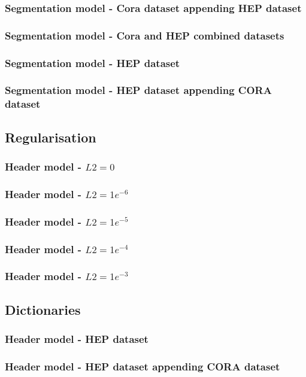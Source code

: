 \documentclass[10pt, oneside]{scrartcl}   	%
\begin{document}
\subsubsection{Segmentation model - Cora dataset appending HEP dataset}
\subsubsection{Segmentation model - Cora and HEP combined datasets}
\subsubsection{Segmentation model - HEP dataset}
\subsubsection{Segmentation model - HEP dataset appending CORA dataset}
\subsection{Regularisation}
\subsubsection{Header model - $L2 = 0$}
\subsubsection{Header model - $L2 = 1e^{-6}$}
\subsubsection{Header model - $L2 = 1e^{-5}$}
\subsubsection{Header model - $L2 = 1e^{-4}$}
\subsubsection{Header model - $L2 = 1e^{-3}$}
\subsection{Dictionaries}
\subsubsection{Header model - HEP dataset}
\subsubsection{Header model - HEP dataset appending CORA dataset}
\end{document}
